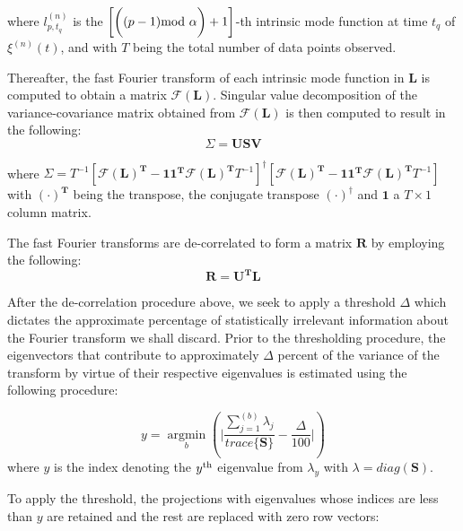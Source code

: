 \documentclass[onecolumn, groupedaddress, 10pt]{revtex4-1}
\begin{document}
where $l_{p,t_q}^{(n)}$ is the $\left[ \bigg( (p-1) \textnormal{mod } \alpha \bigg) + 1\right]$-th intrinsic mode function at time $t_q$ of $\xi^{(n)}(t)$, and with $T$ being the total number of data points observed.

Thereafter, the fast Fourier transform of each intrinsic mode function in $\mathbf{L}$ is computed to obtain a matrix $\mathcal{F} \left( \mathbf{L} \right)$. Singular value decomposition of the variance-covariance matrix obtained from $\mathcal{F}{ \left( \mathbf{L} \right) }$ is then computed to result in the following:
\begin{equation}
\Sigma = \mathbf{USV}
\end{equation}
 
where $\Sigma = T^{-1} \left[ \mathcal{F}(\mathbf{L}) ^{\mathbf{T}} - \mathbf{1}\mathbf{1}^{\mathbf{T}} \mathcal{F}(\mathbf{L})^{\mathbf{T}} T^{-1} \right]^{ \dagger } \left[ \mathcal{F}(\mathbf{L})^{\mathbf{T}} - \mathbf{1}\mathbf{1}^{\mathbf{T}} \mathcal{F}( \mathbf{L})^{\mathbf{T}} T^{-1} \right] $with $(\cdot)^\mathbf{T}$ being the transpose, the conjugate transpose $(\cdot)^\dagger$ and $\mathbf{1}$ a $T \times 1$ column matrix.


The fast Fourier transforms are de-correlated to form a matrix $\mathbf{R}$ by employing the following:
\begin{equation}
\mathbf{R} = \mathbf{U}^{\mathbf{T}}\mathbf{L}
\end{equation}

After the de-correlation procedure above, we seek to apply a threshold $\Delta$ which dictates the approximate percentage of statistically irrelevant information about the Fourier transform we shall discard. Prior to the thresholding procedure, the eigenvectors that contribute to approximately $\Delta$ percent of the variance of the transform by virtue of their respective eigenvalues is estimated using the following procedure:

\begin{equation}
y = \underset{b}{\operatorname{argmin}} \left( \Bigg| \frac{\sum_{j=1}^{(b)} \lambda_j}{trace \{ \mathbf{S} \}} - \frac{\Delta}{100} \Bigg| \right)
\end{equation}
where $y$ is the index denoting the $y^\textnormal{th}$ eigenvalue from $\lambda_y$ with $\lambda = diag{(\mathbf{S})}$.

To apply the threshold, the projections with eigenvalues whose indices are less than $y$ are retained and the rest are replaced with zero row vectors:
\end{document}
